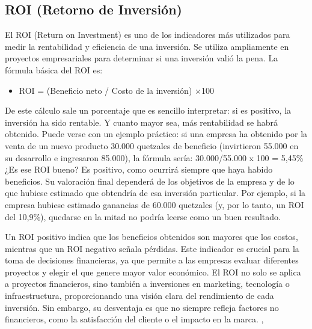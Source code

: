 \documentclass[12pt]{article}
\begin{document}
\subsection*{ROI (Retorno de Inversión)}
El ROI (Return on Investment) es uno de los indicadores más utilizados para medir la rentabilidad y eficiencia de una inversión. Se utiliza ampliamente en proyectos empresariales para determinar si una inversión valió la pena. La fórmula básica del ROI es:
\begin{itemize}
    \item ROI = (Beneficio neto / Costo de la inversión) ×100
\end{itemize}
De este cálculo sale un porcentaje que es sencillo interpretar: si es positivo, la inversión ha sido rentable. Y cuanto mayor sea, más rentabilidad se habrá obtenido.
Puede verse con un ejemplo práctico: si una empresa ha obtenido por la venta de un nuevo producto 30.000 quetzales de beneficio (invirtieron 55.000 en su desarrollo e ingresaron 85.000), la fórmula sería: 30.000/55.000 x 100 = 5,45\%
¿Es ese ROI bueno? Es positivo, como ocurrirá siempre que haya habido beneficios. Su valoración final dependerá de los objetivos de la empresa y de lo que hubiese estimado que obtendría de esa inversión particular. Por ejemplo, si la empresa hubiese estimado ganancias de 60.000 quetzales (y, por lo tanto, un ROI del 10,9\%), quedarse en la mitad no podría leerse como un buen resultado.

Un ROI positivo indica que los beneficios obtenidos son mayores que los costos, mientras que un ROI negativo señala pérdidas. Este indicador es crucial para la toma de decisiones financieras, ya que permite a las empresas evaluar diferentes proyectos y elegir el que genere mayor valor económico. El ROI no solo se aplica a proyectos financieros, sino también a inversiones en marketing, tecnología o infraestructura, proporcionando una visión clara del rendimiento de cada inversión. Sin embargo, su desventaja es que no siempre refleja factores no financieros, como la satisfacción del cliente o el impacto en la marca.
\cite{bbvaROI}, \cite{rdstationROI}
\end{document}
